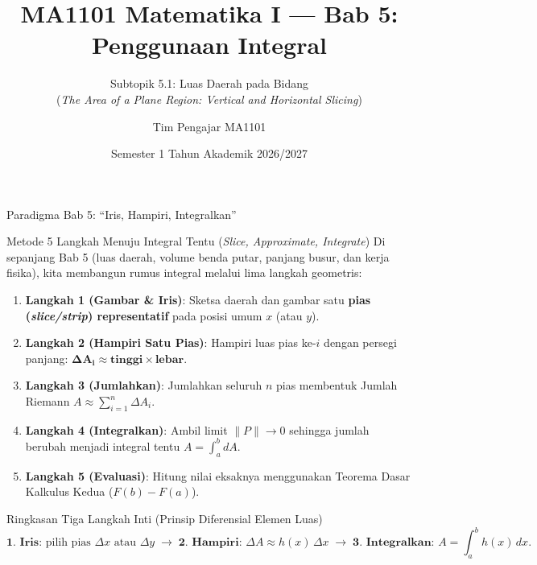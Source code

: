 \documentclass[aspectratio=43,10pt]{beamer}
\title[MA1101 Matematika I]{MA1101 Matematika I --- Bab 5: Penggunaan Integral}
\subtitle{Subtopik 5.1: Luas Daerah pada Bidang\\(\textit{The Area of a Plane Region: Vertical and Horizontal Slicing})}
\author[FMIPA ITB]{Tim Pengajar MA1101}
\institute[ITB]{Fakultas Matematika dan Ilmu Pengetahuan Alam\\Institut Teknologi Bandung}
\date{Semester 1 Tahun Akademik 2026/2027}
\begin{document}
\begin{frame}
    \titlepage
\end{frame}

\begin{frame}{Paradigma Bab 5: ``Iris, Hampiri, Integralkan''}
    \begin{block}{Metode 5 Langkah Menuju Integral Tentu (\textit{Slice, Approximate, Integrate})}
        \scriptsize
        Di sepanjang Bab 5 (luas daerah, volume benda putar, panjang busur, dan kerja fisika), kita membangun rumus integral melalui lima langkah geometris:
        \begin{enumerate}\itemsep=2pt
            \item \textbf{Langkah 1 (Gambar \& Iris)}: Sketsa daerah dan gambar satu \textbf{pias (\textit{slice/strip}) representatif} pada posisi umum $x$ (atau $y$).
            \item \textbf{Langkah 2 (Hampiri Satu Pias)}: Hampiri luas pias ke-$i$ dengan persegi panjang: $\mathbf{\Delta A_i \approx \text{tinggi} \times \text{lebar}}$.
            \item \textbf{Langkah 3 (Jumlahkan)}: Jumlahkan seluruh $n$ pias membentuk Jumlah Riemann $A \approx \sum_{i=1}^{n} \Delta A_i$.
            \item \textbf{Langkah 4 (Integralkan)}: Ambil limit $\|P\| \to 0$ sehingga jumlah berubah menjadi integral tentu $A = \int_a^b dA$.
            \item \textbf{Langkah 5 (Evaluasi)}: Hitung nilai eksaknya menggunakan Teorema Dasar Kalkulus Kedua ($F(b) - F(a)$).
        \end{enumerate}
    \end{block}

    \begin{exampleblock}{Ringkasan Tiga Langkah Inti (Prinsip Diferensial Elemen Luas)}
        \scriptsize\abovedisplayskip=2pt\belowdisplayskip=2pt
        $$\textbf{1. Iris: }\text{pilih pias }\Delta x\text{ atau }\Delta y \;\longrightarrow\; \textbf{2. Hampiri: }\Delta A \approx h(x)\,\Delta x \;\longrightarrow\; \textbf{3. Integralkan: }A = \int_{a}^{b} h(x)\,dx.$$
    \end{exampleblock}
\end{frame}
\end{document}
